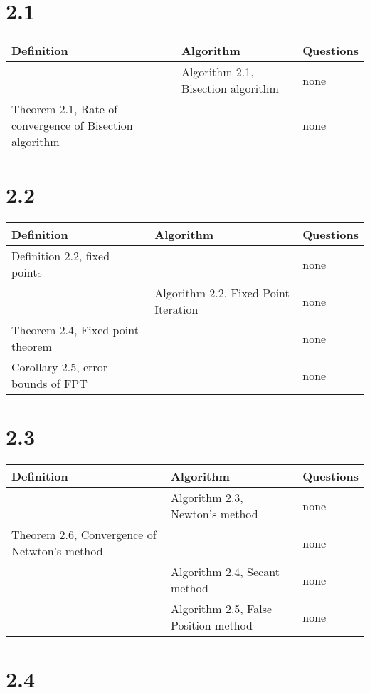 \documentclass{article}
\begin{document}
\section*{2.1}

\begin{tabularx}{\textwidth}{ |X|X|X| }
    \hline
	{\bf Definition} & {\bf Algorithm} & {\bf Questions} \\
    \hline
	 & Algorithm 2.1, Bisection algorithm & none \\
    \hline
	Theorem 2.1, Rate of convergence of Bisection algorithm & & none \\
    \hline
\end{tabularx}

\section*{2.2}

\begin{tabularx}{\textwidth}{ |X|X|X| }
    \hline
	{\bf Definition} & {\bf Algorithm} & {\bf Questions} \\
    \hline
	Definition 2.2, fixed points & & none \\
    \hline
	 & Algorithm 2.2, Fixed Point Iteration & none \\
    \hline
	Theorem 2.4, Fixed-point theorem & & none \\
    \hline
	Corollary 2.5, error bounds of FPT & & none \\
    \hline
\end{tabularx}

\section*{2.3}

\begin{tabularx}{\textwidth}{ |X|X|X| }
    \hline
	{\bf Definition} & {\bf Algorithm} & {\bf Questions} \\
    \hline
	 & Algorithm 2.3, Newton's method & none \\
    \hline
	Theorem 2.6, Convergence of Netwton's method & & none \\
    \hline
	 & Algorithm 2.4, Secant method & none \\
    \hline
	 & Algorithm 2.5, False Position method & none \\
    \hline
\end{tabularx}

\section*{2.4}
\end{document}
